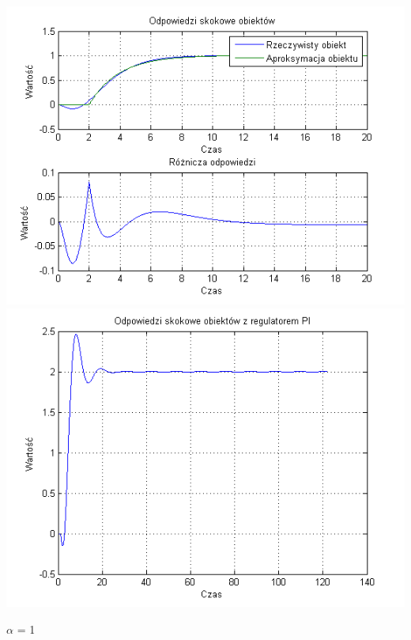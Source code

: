 \documentclass[10pt,a4paper]{article}
\begin{document}
\begin{center}
\includegraphics[scale=1]{images/jeden/skrypt_241.png}\\
\includegraphics[scale=1]{images/jeden/skrypt_242.png}\\
\end{center}
\newpage
$\alpha$ = 1
\end{document}
